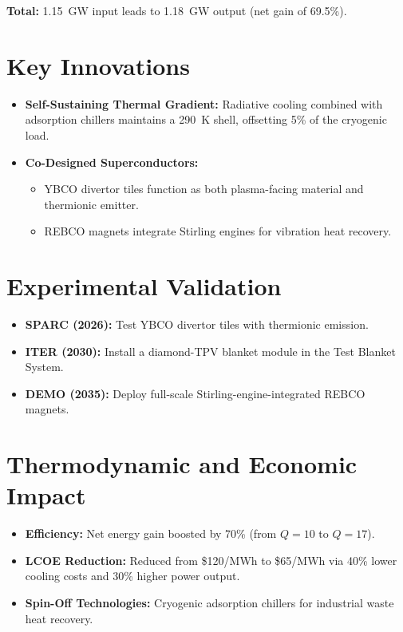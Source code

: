 \documentclass[12pt]{article}
\begin{document}
\noindent \textbf{Total:} 1.15~GW input leads to 1.18~GW output (net gain of 69.5\%).

\section{Key Innovations}
\begin{itemize}
    \item \textbf{Self-Sustaining Thermal Gradient:} Radiative cooling combined with adsorption chillers maintains a 290~K shell, offsetting 5\% of the cryogenic load.
    \item \textbf{Co-Designed Superconductors:}
    \begin{itemize}
        \item YBCO divertor tiles function as both plasma-facing material and thermionic emitter.
        \item REBCO magnets integrate Stirling engines for vibration heat recovery.
    \end{itemize}
\end{itemize}

\section{Experimental Validation}
\begin{itemize}
    \item \textbf{SPARC (2026):} Test YBCO divertor tiles with thermionic emission.
    \item \textbf{ITER (2030):} Install a diamond-TPV blanket module in the Test Blanket System.
    \item \textbf{DEMO (2035):} Deploy full-scale Stirling-engine-integrated REBCO magnets.
\end{itemize}

\section{Thermodynamic and Economic Impact}
\begin{itemize}
    \item \textbf{Efficiency:} Net energy gain boosted by 70\% (from $Q=10$ to $Q=17$).
    \item \textbf{LCOE Reduction:} Reduced from \$120/MWh to \$65/MWh via 40\% lower cooling costs and 30\% higher power output.
    \item \textbf{Spin-Off Technologies:} Cryogenic adsorption chillers for industrial waste heat recovery.
\end{itemize}
\end{document}
